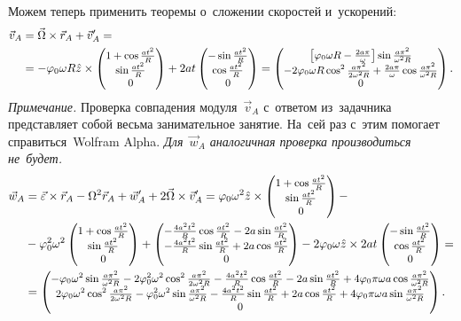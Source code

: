 \documentclass{weekly}
\begin{document}
Можем теперь применить теоремы о~сложении скоростей и~ускорений:
\begin{align}
\begin{split}
    \vec v_A &= \vec\Omega \times \vec r_A + \vec v'_A = \\
        &= -\varphi_0 \omega R \hat z \times
            \small\begin{pmatrix}1 + \cos\frac{at^2}{R}\\\sin\frac{at^2}{R}\\0\end{pmatrix} +
            2at \small\begin{pmatrix}-\sin\frac{at^2}{R}\\\cos\frac{at^2}{R}\\0\end{pmatrix}
        = \small\begin{pmatrix}\left[\varphi_0 \omega R -
            \frac{2a\pi}{\omega} \right]\sin\frac{a\pi^2}{\omega^2 R}\\-2\varphi_0 \omega R \cos^2\frac{a\pi^2}{2\omega^2 R} +
            \frac{2a\pi}{\omega} \cos\frac{a\pi^2}{\omega^2 R}\\0\end{pmatrix}.
        \label{2.14:vA}
\end{split}
\end{align}
\textsl{Примечание.} Проверка совпадения модуля~$\vec v_A$
с~ответом из~задачника представляет собой
весьма занимательное занятие. На~сей раз с~этим
помогает справиться~Wolfram Alpha. \emph{Для~$\vec w_A$
аналогичная проверка производиться не~будет.}
\begin{align}
\begin{split}
    \vec w_A &= \vec\varepsilon \times \vec r_A -
            \Omega^2 \vec r_A + \vec w_A' +
            2\vec\Omega \times \vec v_A'
        = \varphi_0 \omega^2 \hat z \times
            \small\begin{pmatrix}1 + \cos\frac{at^2}{R}\\\sin\frac{at^2}{R}\\0\end{pmatrix} -\\&- \varphi_0^2 \omega^2
            \small\begin{pmatrix}1 + \cos\frac{at^2}{R}\\\sin\frac{at^2}{R}\\0\end{pmatrix} +
            \small\begin{pmatrix}-\frac{4a^2 t^2}{R}\cos\frac{at^2}{R} -
            2a\sin\frac{at^2}{R}\\-\frac{4a^2 t^2}{R}\sin\frac{at^2}{R} +
            2a\cos\frac{at^2}{R}\\0\end{pmatrix} -
            2\varphi_0 \omega \hat z \times
            2at \small\begin{pmatrix}-\sin\frac{at^2}{R}\\\cos\frac{at^2}{R}\\0\end{pmatrix} = \\
        &= \small\begin{pmatrix}-\varphi_0\omega^2\sin\frac{a\pi^2}{\omega^2 R} -
                2\varphi_0^2\omega^2\cos^2\frac{a\pi^2}{2\omega^2 R}-
                \frac{4a^2 t^2}{R}\cos\frac{at^2}{R} -
                2a\sin\frac{at^2}{R} +
                4\varphi_0\pi\omega a \cos\frac{a\pi^2}{\omega^2 R}\\2\varphi_0\omega^2\cos^2\frac{a\pi^2}{2\omega^2 R} -
                \varphi_0^2\omega^2\sin\frac{a\pi^2}{\omega^2 R} -
                \frac{4a^2 t^2}{R}\sin\frac{at^2}{R} +
                2a\cos\frac{at^2}{R} +
                4\varphi_0\pi\omega a \sin\frac{a\pi^2}{\omega^2 R}\\0\end{pmatrix}. \label{2.14:wA}
\end{split}
\end{align}
\end{document}
